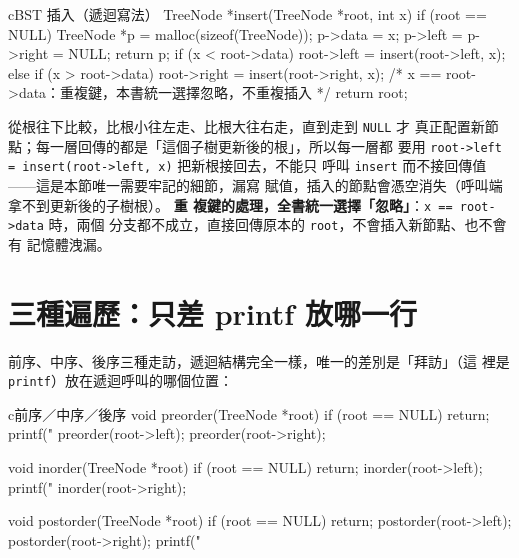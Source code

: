 \begin{code}{c}{BST 插入（遞迴寫法）}
TreeNode *insert(TreeNode *root, int x) {
    if (root == NULL) {
        TreeNode *p = malloc(sizeof(TreeNode));
        p->data = x;
        p->left = p->right = NULL;
        return p;
    }
    if (x < root->data) {
        root->left = insert(root->left, x);
    } else if (x > root->data) {
        root->right = insert(root->right, x);
    }
    /* x == root->data：重複鍵，本書統一選擇忽略，不重複插入 */
    return root;
}
\end{code}

從根往下比較，比根小往左走、比根大往右走，直到走到 \texttt{NULL} 才
真正配置新節點；每一層回傳的都是「這個子樹更新後的根」，所以每一層都
要用 \texttt{root->left = insert(root->left, x)} 把新根接回去，不能只
呼叫 \texttt{insert} 而不接回傳值——這是本節唯一需要牢記的細節，漏寫
賦值，插入的節點會憑空消失（呼叫端拿不到更新後的子樹根）。 \textbf{重
複鍵的處理，全書統一選擇「忽略」}：\texttt{x == root->data} 時，兩個
分支都不成立，直接回傳原本的 \texttt{root}，不會插入新節點、也不會有
記憶體洩漏。


\section{三種遍歷：只差 printf 放哪一行}
\label{sec:ds-traversals}

前序、中序、後序三種走訪，遞迴結構完全一樣，唯一的差別是「拜訪」（這
裡是 \texttt{printf}）放在遞迴呼叫的哪個位置：

\begin{code}{c}{前序／中序／後序}
void preorder(TreeNode *root) {
    if (root == NULL) return;
    printf("%
    preorder(root->left);
    preorder(root->right);
}

void inorder(TreeNode *root) {
    if (root == NULL) return;
    inorder(root->left);
    printf("%
    inorder(root->right);
}

void postorder(TreeNode *root) {
    if (root == NULL) return;
    postorder(root->left);
    postorder(root->right);
    printf("%
}
\end{code}


